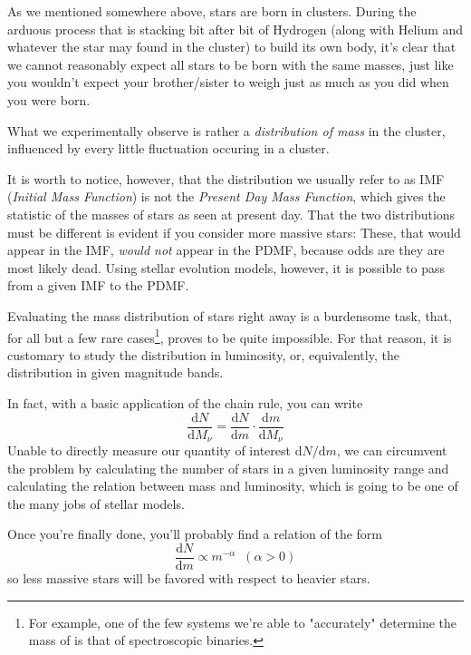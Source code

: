 As we mentioned somewhere above, stars are born in clusters. During the arduous process that is stacking bit after bit of Hydrogen (along with Helium and whatever the star may found in the cluster) to build its own body, it's clear that we cannot reasonably expect all stars to be born with the same masses, just like you wouldn't expect your brother/sister to weigh just as much as you did when you were born.
\par What we experimentally observe is rather a \emph{distribution of mass} in the cluster, influenced by every little fluctuation occuring in a cluster.
\par It is worth to notice, however, that the distribution we usually refer to as IMF (\emph{Initial Mass Function}) is not the \emph{Present Day Mass Function}, which gives the statistic of the masses of stars as seen at present day. That the two distributions must be different is evident if you consider more massive stars: These, that would appear in the IMF, \emph{would not} appear in the PDMF, because odds are they are most likely dead. Using stellar evolution models, however, it is possible to pass from a given IMF to the PDMF.
\par Evaluating the mass distribution of stars right away is a burdensome task, that, for all but a few rare cases\footnote{For example, one of the few systems we're able to "accurately" determine the mass of is that of spectroscopic binaries.}, proves to be quite impossible. For that reason, it is customary to study the distribution in luminosity, or, equivalently, the distribution in given magnitude bands.
\par In fact, with a basic application of the chain rule, you can write
\begin{equation}
	\frac{\text{d}N}{\text{d}M_{\nu}} = \frac{\text{d}N}{\text{d}m} \cdot \frac{\text{d}m}{\text{d}M_{\nu}} 
	\label{eq:luminosityfunction}
\end{equation}
Unable to directly measure our quantity of interest $\text{d}N/\text{d}m$, we can circumvent the problem by calculating the number of stars in a given luminosity range and calculating the relation between mass and luminosity, which is going to be one of the many jobs of stellar models.
\par Once you're finally done, you'll probably find a relation of the form
\begin{equation}
	\frac{\text{d}N}{\text{d}m} \propto m^{-\alpha} \;\;(\alpha > 0)
	\label{eq:imf}
\end{equation}
so less massive stars will be favored with respect to heavier stars.
